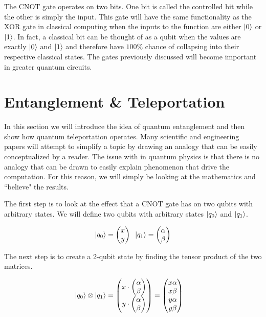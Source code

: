 \documentclass[conference]{IEEEtran}
\begin{document}
The CNOT gate operates on two bits. One bit is called the controlled bit while the other is simply the input. This gate will have the same functionality as the XOR gate in classical computing when the inputs to the function are either $\ket{0}$ or $\ket{1}$. In fact, a classical bit can be thought of as a qubit when the values are exactly $\ket{0}$ and $\ket{1}$ and therefore have $100 \%$ chance of collapsing into their respective classical states. The gates previously discussed will become important in greater quantum circuits.

\section{Entanglement \& Teleportation}

In this section we will introduce the idea of quantum entanglement and then show how quantum teleportation operates. Many scientific and engineering papers will attempt to simplify a topic by drawing an analogy that can be easily conceptualized by a reader. The issue with in quantum physics is that there is no analogy that can be drawn to easily explain phenomenon that drive the computation. For this reason, we will simply be looking at the mathematics and ``believe" the results.

The first step is to look at the effect that a CNOT gate has on two qubits with arbitrary states. We will define two qubits with arbitrary states $\ket{q_0}$ and $\ket{q_1}$.

\begin{align*}
\ket{q_0} = \begin{pmatrix}x\\y\end{pmatrix}\;\;
\ket{q_1} = \begin{pmatrix}\alpha\\\beta\end{pmatrix}
\end{align*}

The next step is to create a 2-qubit state by finding the tensor product of the two matrices.

\begin{align*}
\ket{q_0} \otimes \ket{q_1} &= \begin{pmatrix}
x \cdot \begin{pmatrix}\alpha\\\beta\end{pmatrix}\\
y \cdot \begin{pmatrix}\alpha\\\beta\end{pmatrix}
\end{pmatrix}
= \begin{pmatrix}x\alpha\\x\beta\\y\alpha\\y\beta\end{pmatrix}
\end{align*}
\end{document}
